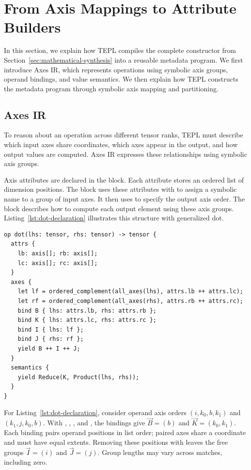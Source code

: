 \section{From Axis Mappings to Attribute Builders}
\label{sec:method}

In this section, we explain how TEPL compiles the complete constructor from
Section~\ref{sec:mathematical-synthesis} into a reusable metadata program.
We first introduce Axes IR, which represents operations using symbolic
axis groups, operand bindings, and value semantics. We then explain how
TEPL constructs the metadata program through symbolic axis mapping
and partitioning.

\subsection{Axes IR}
\label{sec:axes-ir}
To reason about an operation across different tensor ranks, TEPL must
describe which input axes share coordinates, which axes appear in the
output, and how output values are computed. Axes IR expresses these
relationships using symbolic axis groups.

Axis attributes are declared in the  block. Each
 attribute stores an ordered list of dimension positions.
The  block uses these attributes with  to assign
a symbolic name to a group of input axes. It then uses 
to specify the output axis order. The  block describes
how to compute each output element using these axis groups.
Listing~\ref{lst:dot-declaration} illustrates this structure with
generalized dot.

\begin{lstlisting}[language=TEPL,
  caption={Axes IR declaration for generalized dot.},
  label={lst:dot-declaration}]
op dot(lhs: tensor, rhs: tensor) -> tensor {
  attrs {
    lb: axis[]; rb: axis[];
    lc: axis[]; rc: axis[];
  }
  axes {
    let lf = ordered_complement(all_axes(lhs), attrs.lb ++ attrs.lc);
    let rf = ordered_complement(all_axes(rhs), attrs.rb ++ attrs.rc);
    bind B { lhs: attrs.lb, rhs: attrs.rb };
    bind K { lhs: attrs.lc, rhs: attrs.rc };
    bind I { lhs: lf };
    bind J { rhs: rf };
    yield B ++ I ++ J;
  }
  semantics {
    yield Reduce(K, Product(lhs, rhs));
  }
}
\end{lstlisting}

For Listing~\ref{lst:dot-declaration}, consider operand axis orders
$(i,k_0,b,k_1)$ and $(k_1,j,k_0,b)$.
With , , , and ,
the bindings give $\vec B=(b)$ and $\vec K=(k_0,k_1)$.
Each binding pairs operand positions in list order; paired axes share
a coordinate and must have equal extents.
Removing these positions with  leaves the
free groups $\vec I=(i)$ and $\vec J=(j)$.
Group lengths may vary across matches, including zero.

